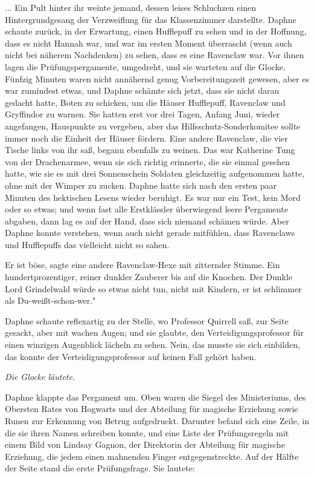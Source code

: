 ... Ein Pult hinter ihr weinte jemand, dessen leises Schluchzen einen
Hintergrundgesang der Verzweiflung für das Klassenzimmer darstellte. Daphne
schaute zurück, in der Erwartung, einen Hufflepuff zu sehen und in der Hoffnung,
dass es nicht Hannah war, und war im ersten Moment überrascht (wenn auch nicht
bei näherem Nachdenken) zu sehen, dass es eine Ravenclaw war. Vor ihnen lagen
die Prüfungspergamente, umgedreht, und sie warteten auf die Glocke. Fünfzig
Minuten waren nicht annähernd genug Vorbereitungszeit gewesen, aber es war
zumindest etwas, und Daphne schämte sich jetzt, dass sie nicht daran gedacht
hatte, Boten zu schicken, um die Häuser Hufflepuff, Ravenclaw und Gryffindor zu
warnen. Sie hatten erst vor drei Tagen, Anfang Juni, wieder angefangen,
Hauspunkte zu vergeben, aber das Hilfsschutz-Sonderkomitee sollte immer noch die
Einheit der Häuser fördern. Eine andere Ravenclaw, die vier Tische links von ihr
saß, begann ebenfalls zu weinen. Das war Katherine Tung von der Drachenarmee,
wenn sie sich richtig erinnerte, die sie einmal gesehen hatte, wie sie es mit
drei Sonnenschein Soldaten gleichzeitig aufgenommen hatte, ohne mit der Wimper
zu zucken. Daphne hatte sich nach den ersten paar Minuten des hektischen Lesens
wieder beruhigt. Es war nur ein Test, kein Mord oder so etwas; und wenn fast
alle Erstklässler überwiegend leere Pergamente abgaben, dann lag es auf der
Hand, dass sich niemand schämen würde. Aber Daphne konnte verstehen, wenn auch
nicht gerade mitfühlen, dass Ravenclaws und Hufflepuffs das vielleicht nicht so
sahen.

\glqq Er ist böse\grqq{}, sagte eine andere Ravenclaw-Hexe mit zitternder
Stimme. \glqq Ein hundertprozentiger, reiner dunkler Zauberer bis auf die
Knochen. Der Dunkle Lord Grindelwald würde so etwas nicht tun, nicht mit
Kindern, er ist schlimmer als Du-weißt-schon-wer."

Daphne schaute reflexartig zu der Stelle, wo Professor Quirrell saß, zur Seite
gesackt, aber mit wachen Augen; und sie glaubte, den Verteidigungsprofessor für
einen winzigen Augenblick lächeln zu sehen. Nein, das musste sie sich einbilden,
das konnte der Verteidigungsprofessor auf keinen Fall gehört haben.

\emph{Die Glocke läutete.}

Daphne klappte das Pergament um. Oben waren die Siegel des Ministeriums, des
Obersten Rates von Hogwarts und der Abteilung für magische Erziehung sowie Runen
zur Erkennung von Betrug aufgedruckt. Darunter befand sich eine Zeile, in die
sie ihren Namen schreiben konnte, und eine Liste der Prüfungsregeln mit einem
Bild von Lindsay Gagnon, der Direktorin der Abteilung für magische Erziehung,
die jedem einen mahnenden Finger entgegenstreckte. Auf der Hälfte der Seite
stand die erste Prüfungsfrage. Sie lautete:

